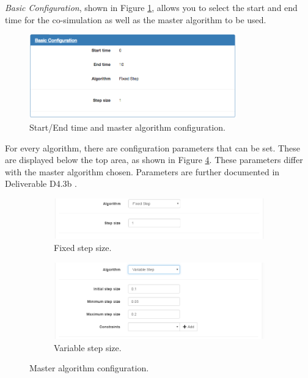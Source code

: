 \textit{Basic Configuration}, shown in Figure \ref{fig:cosim-top}, allows you to select the start and end time for the co-simulation as well as the master algorithm to be used.
%
%
%
\begin{figure}[ht]
\centering
\includegraphics[width=0.8\textwidth]{./figures/app/cosim-top}
\caption{Start/End time and master algorithm configuration.}
\label{fig:cosim-top}
\end{figure}
%
%
%
For every algorithm, there are configuration parameters that can be set. These
are displayed below the top area, as shown in Figure \ref{fig:ma-config}. These parameters differ with the master algorithm chosen.  Parameters are further documented in Deliverable D4.3b \cite{INTOCPSD4.3b}.
%
%
%
\begin{figure}[ht]
\centering
\begin{subfigure}[b]{\textwidth}
  \includegraphics[width=\textwidth]{figures/app/ma-config-fixed}
  \caption{Fixed step size.}
  \label{fig:ma-conf-fix}
\end{subfigure}
\begin{subfigure}[b]{\textwidth}
  \includegraphics[width=\textwidth]{figures/app/ma-config-variable}
  \caption{Variable step size.}
  \label{fig:ma-conf-var}
\end{subfigure}
\caption{Master algorithm configuration.}
\label{fig:ma-config}
\end{figure}
%
%
%


